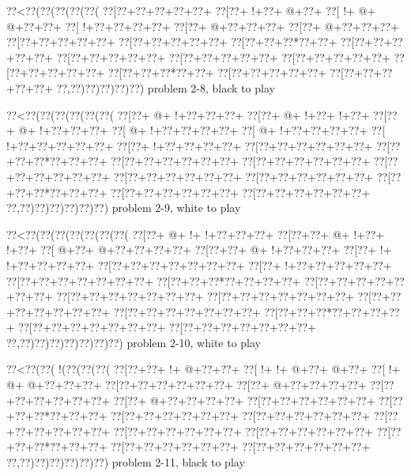 \vbox{\vbox{\goo
\0??<\0??(\0??(\0??(\0??(\0??(
\0??[\0??+\0??+\0??+\0??+\0??+
\0??[\0??+\- !+\0??+\- @+\0??+
\0??[\- !+\- @+\- @+\0??+\0??+
\0??[\- !+\0??+\0??+\0??+\0??+
\0??[\0??+\- @+\0??+\0??+\0??+
\0??[\0??+\- @+\0??+\0??+\0??+
\0??[\0??+\0??+\0??+\0??+\0??+
\0??[\0??+\0??+\0??+\0??+\0??+
\0??[\0??+\0??+\0??*\0??+\0??+
\0??[\0??+\0??+\0??+\0??+\0??+
\0??[\0??+\0??+\0??+\0??+\0??+
\0??[\0??+\0??+\0??+\0??+\0??+
\0??[\0??+\0??+\0??+\0??+\0??+
\0??[\0??+\0??+\0??+\0??+\0??+
\0??[\0??+\0??+\0??*\0??+\0??+
\0??[\0??+\0??+\0??+\0??+\0??+
\0??[\0??+\0??+\0??+\0??+\0??+
\0??,\0??)\0??)\0??)\0??)\0??)
}
\hfil problem 2-8, black to play\hfil\break
}

\vbox{\vbox{\goo
\0??<\0??(\0??(\0??(\0??(\0??(\0??(
\0??[\0??+\- @+\- !+\0??+\0??+\0??+
\0??[\0??+\- @+\- !+\0??+\- !+\0??+
\0??[\0??+\- @+\- !+\0??+\0??+\0??+
\0??[\- @+\- !+\0??+\0??+\0??+\0??+
\0??[\- @+\- !+\0??+\0??+\0??+\0??+
\0??[\- !+\0??+\0??+\0??+\0??+\0??+
\0??[\0??+\- !+\0??+\0??+\0??+\0??+
\0??[\0??+\0??+\0??+\0??+\0??+\0??+
\0??[\0??+\0??+\0??*\0??+\0??+\0??+
\0??[\0??+\0??+\0??+\0??+\0??+\0??+
\0??[\0??+\0??+\0??+\0??+\0??+\0??+
\0??[\0??+\0??+\0??+\0??+\0??+\0??+
\0??[\0??+\0??+\0??+\0??+\0??+\0??+
\0??[\0??+\0??+\0??+\0??+\0??+\0??+
\0??[\0??+\0??+\0??*\0??+\0??+\0??+
\0??[\0??+\0??+\0??+\0??+\0??+\0??+
\0??[\0??+\0??+\0??+\0??+\0??+\0??+
\0??,\0??)\0??)\0??)\0??)\0??)\0??)
}
\hfil problem 2-9, white to play\hfil\break
}

\vbox{\vbox{\goo
\0??<\0??(\0??(\0??(\0??(\0??(\0??(\0??(
\0??[\0??+\- @+\- !+\- !+\0??+\0??+\0??+
\0??[\0??+\0??+\- @+\- !+\0??+\- !+\0??+
\0??[\- @+\0??+\- @+\0??+\0??+\0??+\0??+
\0??[\0??+\0??+\- @+\- !+\0??+\0??+\0??+
\0??[\0??+\- !+\- !+\0??+\0??+\0??+\0??+
\0??[\0??+\0??+\0??+\0??+\0??+\0??+\0??+
\0??[\0??+\- !+\0??+\0??+\0??+\0??+\0??+
\0??[\0??+\0??+\0??+\0??+\0??+\0??+\0??+
\0??[\0??+\0??+\0??*\0??+\0??+\0??+\0??+
\0??[\0??+\0??+\0??+\0??+\0??+\0??+\0??+
\0??[\0??+\0??+\0??+\0??+\0??+\0??+\0??+
\0??[\0??+\0??+\0??+\0??+\0??+\0??+\0??+
\0??[\0??+\0??+\0??+\0??+\0??+\0??+\0??+
\0??[\0??+\0??+\0??+\0??+\0??+\0??+\0??+
\0??[\0??+\0??+\0??*\0??+\0??+\0??+\0??+
\0??[\0??+\0??+\0??+\0??+\0??+\0??+\0??+
\0??[\0??+\0??+\0??+\0??+\0??+\0??+\0??+
\0??,\0??)\0??)\0??)\0??)\0??)\0??)\0??)
}
\hfil problem 2-10, white to play\hfil\break
}

\vbox{\vbox{\goo
\0??<\0??(\0??(\- !(\0??(\0??(\0??(
\0??[\0??+\0??+\- !+\- @+\0??+\0??+
\0??[\- !+\- !+\- @+\0??+\- @+\0??+
\0??[\- !+\- @+\- @+\0??+\0??+\0??+
\0??[\0??+\0??+\0??+\0??+\0??+\0??+
\0??[\0??+\- @+\0??+\0??+\0??+\0??+
\0??[\0??+\0??+\0??+\0??+\0??+\0??+
\0??[\0??+\- @+\0??+\0??+\0??+\0??+
\0??[\0??+\0??+\0??+\0??+\0??+\0??+
\0??[\0??+\0??+\0??*\0??+\0??+\0??+
\0??[\0??+\0??+\0??+\0??+\0??+\0??+
\0??[\0??+\0??+\0??+\0??+\0??+\0??+
\0??[\0??+\0??+\0??+\0??+\0??+\0??+
\0??[\0??+\0??+\0??+\0??+\0??+\0??+
\0??[\0??+\0??+\0??+\0??+\0??+\0??+
\0??[\0??+\0??+\0??*\0??+\0??+\0??+
\0??[\0??+\0??+\0??+\0??+\0??+\0??+
\0??[\0??+\0??+\0??+\0??+\0??+\0??+
\0??,\0??)\0??)\0??)\0??)\0??)\0??)
}
\hfil problem 2-11, black to play\hfil\break
}

